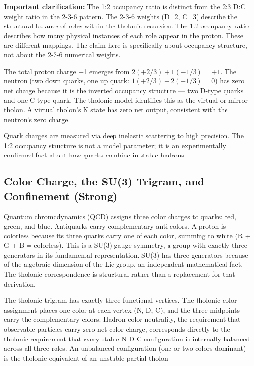 \documentclass[12pt]{article}
\begin{document}
\textbf{Important clarification:} The 1:2 occupancy ratio is distinct
from the 2:3 D:C weight ratio in the 2-3-6 pattern. The 2-3-6 weights
(D=2, C=3) describe the structural balance of roles within the tholonic
recursion. The 1:2 occupancy ratio describes how many physical instances
of each role appear in the proton. These are different mappings. The
claim here is specifically about occupancy structure, not about the
2-3-6 numerical weights.

The total proton charge +1 emerges from \(2(+2/3) + 1(-1/3) = +1\). The
neutron (two down quarks, one up quark: \(1(+2/3) + 2(-1/3) = 0\)) has
zero net charge because it is the inverted occupancy structure --- two
D-type quarks and one C-type quark. The tholonic model identifies this
as the virtual or mirror tholon. A virtual tholon's N state has zero net
output, consistent with the neutron's zero charge.

Quark charges are measured via deep inelastic scattering to high
precision. The 1:2 occupancy structure is not a model parameter; it is
an experimentally confirmed fact about how quarks combine in stable
hadrons.

\subsection{Color Charge, the SU(3) Trigram, and Confinement (Strong)}\label{color-charge-the-su3-trigram-and-confinement-strong}

Quantum chromodynamics (QCD) assigns three color charges to quarks: red,
green, and blue. Antiquarks carry complementary anti-colors. A proton is
colorless because its three quarks carry one of each color, summing to
white (R + G + B = colorless). This is a SU(3) gauge symmetry, a group
with exactly three generators in its fundamental representation. SU(3)
has three generators because of the algebraic dimension of the Lie
group, an independent mathematical fact. The tholonic correspondence is
structural rather than a replacement for that derivation.

The tholonic trigram has exactly three functional vertices. The tholonic
color assignment places one color at each vertex (N, D, C), and the
three midpoints carry the complementary colors. Hadron color neutrality,
the requirement that observable particles carry zero net color charge,
corresponds directly to the tholonic requirement that every stable N-D-C
configuration is internally balanced across all three roles. An
unbalanced configuration (one or two colors dominant) is the tholonic
equivalent of an unstable partial tholon.
\end{document}

